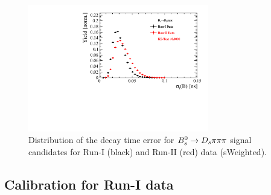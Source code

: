 \begin{figure}[h]
\centering
\includegraphics[height=!,width=0.7\textwidth]{figs/dataVsMC/run1vs2_norm/Ds2all_Bs_DTF_TAUERR.pdf}
\caption{Distribution of the decay time error for ${{B}^0_{s}}\rightarrow{\ensuremath{{D}_{s}}}{\ensuremath{\pi}}{\ensuremath{\pi}}{\ensuremath{\pi}}$ signal candidates for Run-I (black) and Run-II (red) data (sWeighted).}
\label{fig:Bs_DTFERR_Comp}
\end{figure}


\clearpage
\subsection{Calibration for Run-I data} 


